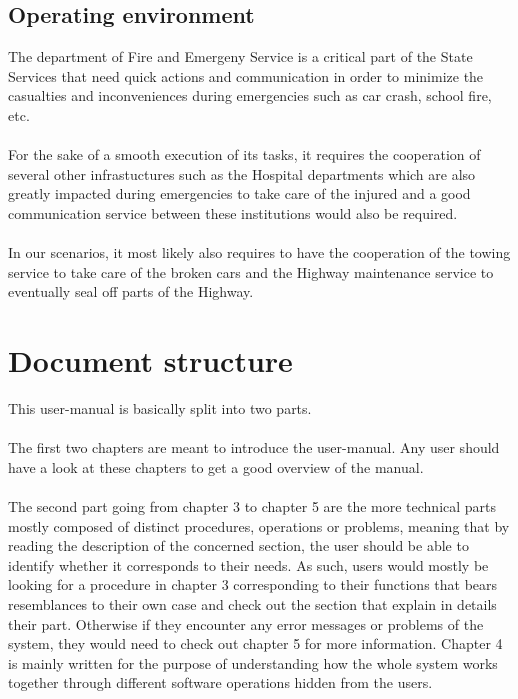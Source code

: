 \subsection{Operating environment}
The department of Fire and Emergeny Service is a critical part of the State
Services that need quick actions and communication in order to minimize the
casualties and inconveniences during emergencies such as car crash, school fire,
etc. \\\\
For the sake of a smooth execution of its tasks, it requires the
cooperation of several other infrastuctures such as the Hospital departments
which are also greatly impacted during emergencies to take care of the injured
and a good communication service between these institutions would also be
required. \\\\
In our scenarios, it most likely also requires to have the cooperation of
the towing service to take care of the broken cars and the Highway maintenance
service to eventually seal off parts of the Highway.

\section{Document structure}  
This user-manual is basically split into two parts. \\\\
The first two chapters are meant to introduce the user-manual. Any user should
have a look at these chapters to get a good overview of the manual. \\\\
The second part going from chapter 3 to chapter 5 are the more technical
parts mostly composed of distinct procedures, operations or problems, meaning
that by reading the description of the concerned section, the user should be
able to identify whether it corresponds to their needs. As such, users would
mostly be looking for a procedure in chapter 3 corresponding to their functions
that bears resemblances to their own case and check out the section that
explain in details their part. Otherwise if they encounter any error messages or
problems of the system, they would need to check out chapter 5 for more
information.
Chapter 4 is mainly written for the purpose of understanding how the whole
system works together through different software operations hidden from the
users.





